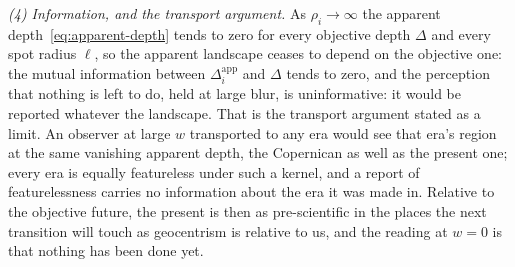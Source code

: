 \documentclass{article}
\begin{document}
\emph{(4) Information, and the transport argument.} As $\rho_i \to \infty$ the apparent depth~\eqref{eq:apparent-depth} tends to zero for every objective depth $\Delta$ and every spot radius $\ell$, so the apparent landscape ceases to depend on the objective one: the mutual information between $\Delta^{\mathrm{app}}_i$ and $\Delta$ tends to zero, and the perception that nothing is left to do, held at large blur, is uninformative: it would be reported whatever the landscape. That is the transport argument stated as a limit. An observer at large $w$ transported to any era would see that era's region at the same vanishing apparent depth, the Copernican as well as the present one; every era is equally featureless under such a kernel, and a report of featurelessness carries no information about the era it was made in. Relative to the objective future, the present is then as pre-scientific in the places the next transition will touch as geocentrism is relative to us, and the reading at $w = 0$ is that nothing has been done yet.
\end{document}
